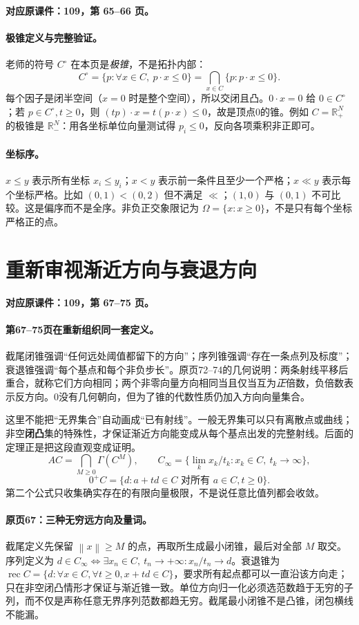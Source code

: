 \documentclass[11pt,a4paper]{article}
\newcommand{\R}{\mathbb{R}}\newcommand{\N}{\mathbb{N}}
\newcommand{\norm}[1]{\left\lVert#1\right\rVert}
\theoremstyle{definition}\newtheorem{definition}{定义}\newtheorem{example}{例}
\begin{document}
\textbf{对应原课件：109，第 65--66 页。}


\paragraph{极锥定义与完整验证。}
老师的符号 $C^\circ$ 在本页是\emph{极锥}，不是拓扑内部：
\[C^\circ=\{p:\forall x\in C,\ p\cdot x\le0\}
=\bigcap_{x\in C}\{p:p\cdot x\le0\}.
\]
每个因子是闭半空间（$x=0$ 时是整个空间），所以交闭且凸。$0\cdot x=0$ 给 $0\in C^\circ$；若 $p\in C^\circ,t\ge0$，则 $(tp)\cdot x=t(p\cdot x)\le0$，故是顶点0的锥。例如 $C=\R_+^N$ 的极锥是 $\R_-^N$：用各坐标单位向量测试得 $p_i\le0$，反向各项乘积非正即可。
\paragraph{坐标序。}
$x\le y$ 表示所有坐标 $x_i\le y_i$；$x<y$ 表示前一条件且至少一个严格；$x\ll y$ 表示每个坐标严格。比如 $(0,1)<(0,2)$ 但不满足 $\ll$；$(1,0)$ 与 $(0,1)$ 不可比较。这是偏序而不是全序。非负正交象限记为 $\Omega=\{x:x\ge0\}$，不是只有每个坐标严格正的点。


\clearpage\section{重新审视渐近方向与衰退方向}\label{g:109:67}

\textbf{对应原课件：109，第 67--75 页。}


\paragraph{第67--75页在重新组织同一套定义。}
截尾闭锥强调“任何远处阈值都留下的方向”；序列锥强调“存在一条点列及标度”；衰退锥强调“每个基点和每个非负步长”。原页72--74的几何说明：两条射线平移后重合，就称它们方向相同；两个非零向量方向相同当且仅当互为\emph{正}倍数，负倍数表示反方向。0没有几何朝向，但为了锥的代数性质仍加入方向向量集合。

这里不能把“无界集合”自动画成“已有射线”。一般无界集可以只有离散点或曲线；非空\textbf{闭凸}集的特殊性，才保证渐近方向能变成从每个基点出发的完整射线。后面的定理正是把这段直观变成证明。
\[
AC=\bigcap_{M\ge0}\Gamma(C^M),\qquad
C_\infty=\{\lim_k x_k/t_k:x_k\in C,\ t_k\to\infty\},
\]
\[0^+C=\{d:a+td\in C\text{ 对所有 }a\in C,t\ge0\}.
\]
第二个公式只收集确实存在的有限向量极限，不是说任意比值列都会收敛。


\paragraph{原页67：三种无穷远方向及量词。}截尾定义先保留 $\norm x\ge M$ 的点，再取所生成最小闭锥，最后对全部 $M$ 取交。序列定义为 $d\in C_\infty\iff\exists x_n\in C,\ t_n\to+\infty:x_n/t_n\to d$。衰退锥为 $\operatorname{rec}C=\{d:\forall x\in C,\forall t\ge0,x+td\in C\}$，要求所有起点都可以一直沿该方向走；只在非空闭凸情形才保证与渐近锥一致。单位方向归一化必须选范数趋于无穷的子列，而不仅是声称任意无界序列范数都趋无穷。截尾最小闭锥不是凸锥，闭包横线不能漏。
\end{document}
